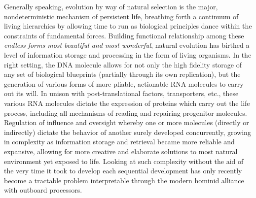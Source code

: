 Generally speaking, evolution by way of natural selection is the major, nondeterministic mechanism of persistent life, breathing forth a continuum of living hierarchies by allowing time to run as biological principles dance within the constraints of fundamental forces. Building functional relationship among these \emph{endless forms most beautiful and most wonderful}\citep{darwin1869origin}, natural evolution has birthed a level of information storage and processing in the form of living organisms. In the right setting, the DNA molecule allows for not only the high fidelity storage of any set of biological blueprints (partially through its own replication), but the generation of various forms of more pliable, actionable RNA molecules to carry out its will. In unison with post-translational factors, transporters, etc., these various RNA molecules dictate the expression of proteins which carry out the life process, including all mechanisms of reading and repairing progenitor molecules. Regulation of influence and oversight whereby one or more molecules (directly or indirectly) dictate the behavior of another surely developed concurrently, growing in complexity as information storage and retrieval became more reliable and expansive, allowing for more creative and elaborate solutions to most natural environment yet exposed to life. Looking at such complexity without the aid of the very time it took to develop each sequential development has only recently become a tractable problem interpretable through the modern hominid alliance with outboard processors.

